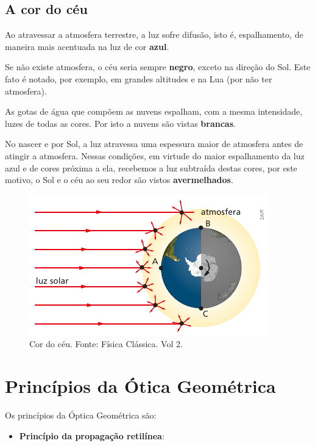 \documentclass[11pt,twocolumn,oneside]{article}
\begin{document}
\hypertarget{x-a-cor-do-céu}{\subsection{A cor do céu}}
Ao atravessar a atmosfera terrestre, a luz sofre difusão, isto é, espalhamento, de maneira mais acentuada na luz de cor \textbf{azul}.


Se não existe atmosfera, o céu seria sempre \textbf{negro}, exceto na direção do Sol. Este fato é notado, por exemplo, em grandes altitudes e na Lua (por não ter atmosfera).


As gotas de água que compõem as nuvens espalham, com a mesma intensidade, luzes de todas as cores. Por isto a nuvens são vistas \textbf{brancas}.


No nascer e por Sol, a luz atravessa uma espessura maior de atmosfera antes de atingir a atmosfera. Nessas condições, em virtude do maior espalhamento da luz azul e de cores próxima a ela, recebemos a luz subtraída destas cores, por este motivo, o Sol e o céu ao seu redor são vistos \textbf{avermelhados}.


\begin{figure}[h]{}
\centering\includegraphics[width=2.5truein]{img14.png}
\caption{Cor do céu. Fonte: Física Clássica. Vol 2.}
\centering
\end{figure}

\hypertarget{x-princípios-da-ótica-geométrica}{\section{Princípios da Ótica Geométrica}}
Os princípios da Óptica Geométrica são:


\begin{itemize}

\item \textbf{Princípio da propagação retilínea}:

\end{itemize}
\end{document}
